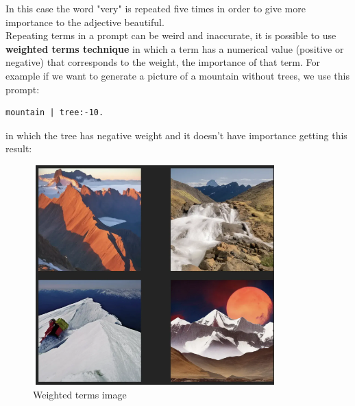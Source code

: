 In this case the word "very" is repeated five times in order to give more importance to the adjective beautiful.\\
Repeating terms in a prompt can be weird and inaccurate, it is possible to use \textbf{weighted terms technique}\cite{weighted_terms} in which a term has a numerical value (positive or negative) that corresponds to the weight, the importance of that term. For example if we want to generate a picture of a mountain without trees, we use this prompt:
\begin{lstlisting}
mountain | tree:-10.
\end{lstlisting}
in which the tree has negative weight and it doesn't have importance getting this result:
\begin{figure}[H]
    \centering
    \includegraphics[width=0.5\linewidth]{Figures/fig_15.png}
    \caption{Weighted terms image}
    \label{fig:enter-label}
\end{figure}

